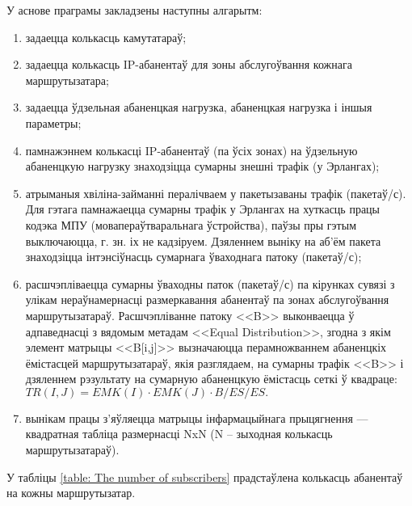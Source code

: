 У аснове праграмы закладзены наступны алгарытм:
\begin{enumerate}
    \item задаецца колькасць камутатараў;
    \item задаецца колькасць IP-абанентаў для зоны абслугоўвання
          кожнага маршрутызатара;
    \item задаецца ўдзельная абаненцкая нагрузка,
          абаненцкая нагрузка і іншыя параметры;
    \item памнажэннем колькасці IP-абанентаў (па ўсіх зонах)
          на ўдзельную абаненцкую нагрузку знаходзіцца
          сумарны знешні трафік (у Эрлангах);
    \item атрыманыя хвіліна-займанні пералічваем у пакетызаваны
          трафік (пакетаў/с).
          Для гэтага памнажаецца сумарны трафік у Эрлангах на
          хуткасць працы кодэка МПУ (мовапераўтваральнага ўстройства),
          паўзы пры гэтым выключаюцца,
          г. зн. іх не кадзіруем. Дзяленнем выніку на
          аб'ём пакета знаходзіцца інтэнсіўнасць
          сумарнага ўваходнага патоку (пакетаў/с);
    \item расшчэпліваецца сумарны ўваходны паток (пакетаў/с) па
          кірунках сувязі з улікам нераўнамернасці размеркавання
          абанентаў па зонах абслугоўвання маршрутызатараў.
          Расшчэпліванне патоку <<B>> выконваецца ў адпаведнасці
          з вядомым метадам <<Equal Distribution>>, згодна з якім
          элемент матрыцы <<B[i,j]>> вызначаюцца перамножваннем
          абаненцкіх ёмістасцей маршрутызатараў, якія разглядаем,
          на сумарны трафік <<B>> і дзяленнем рэзультату на
          сумарную абаненцкую ёмістасць сеткі ў квадраце:
          $TR(I,J) = EMK(I) \cdot EMK(J) \cdot B / ES / ES.$
    \item вынікам працы з'яўляецца матрыцы інфармацыйнага прыцягнення ---
          квадратная таб\-лі\-ца размернасці NxN (N -- зыходная колькасць
          маршрутызатараў).
\end{enumerate}

У табліцы \ref{table: The number of subscribers} прадстаўлена
колькасць абанентаў на кожны маршрутызатар.

